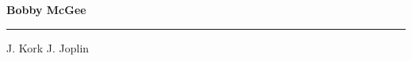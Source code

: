 \documentclass[10pt]{book}
\begin{document}
{
  \samepage
  \raggedbottom
  \raggedright
  \sloppy


  \vspace{0.2in}

  \noindent\begin{minipage}{.1\textwidth}
    \hfill\vspace{0.1in}
  \end{minipage}%
  \noindent\begin{minipage}{.8\textwidth}
    \centering
    \bfseries
    \large Bobby McGee
  \end{minipage}%
  \noindent\begin{minipage}{.1\textwidth}
      \hfill\vspace{0.1in}
  \end{minipage}

  \nopagebreak[4]
  \vspace{0.1in}
  \nopagebreak[4]
  \hrule height 0.05ex
  \nopagebreak[4]
  \vspace{-0.05in}

  {\footnotesize J. Kork \hfill J. Joplin }\\
  \vspace{0.01in}



}
\end{document}
